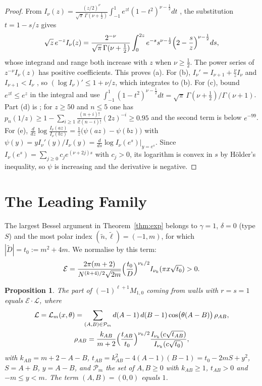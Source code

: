 \documentclass[11pt]{amsart}
\numberwithin{equation}{section}
\theoremstyle{plain}
\newtheorem{prop}[thm]{Proposition}
\theoremstyle{definition}
\theoremstyle{remark}
\newcommand{\cE}{\mathcal{E}}
\newcommand{\cL}{\mathcal{L}}
\begin{document}
\begin{proof}
From $I_\nu(z)=\frac{(z/2)^\nu}{\sqrt\pi\,\Gamma(\nu+\frac12)}\int_{-1}^1e^{zt}(1-t^2)^{\nu-\frac12}dt$ \cite[10.32.2]{DLMF}, the substitution $t=1-s/z$ gives
\[
\sqrt z\,e^{-z}I_\nu(z)=\frac{2^{-\nu}}{\sqrt\pi\,\Gamma(\nu+\frac12)}\int_0^{2z}e^{-s}s^{\nu-\frac12}\Bigl(2-\frac sz\Bigr)^{\nu-\frac12}ds,
\]
whose integrand and range both increase with $z$ when $\nu\ge\frac12$. The power series of $z^{-\nu}I_\nu(z)$ has positive coefficients. This proves (a). For (b), $I_\nu'=I_{\nu+1}+\frac\nu zI_\nu$ and $I_{\nu+1}<I_\nu$ \cite{Son65}, so $(\log I_\nu)'\le1+\nu/z$, which integrates to (b). For (c), bound $e^{zt}\le e^z$ in the integral and use $\int_{-1}^1(1-t^2)^{\nu-\frac12}dt=\sqrt\pi\,\Gamma(\nu+\frac12)/\Gamma(\nu+1)$. Part (d) is \cite[10.47.11, 10.49.12]{DLMF}; for $z\ge50$ and $n\le5$ one has $p_n(1/z)\ge1-\sum_{i\ge1}\frac{(n+i)!}{i!(n-i)!}(2z)^{-i}\ge0.95$ and the second term is below $e^{-99}$. For (e), $\frac{d}{dz}\log\frac{I_\nu(az)}{I_\nu(bz)}=\frac1z\bigl(\psi(az)-\psi(bz)\bigr)$ with $\psi(y)=yI_\nu'(y)/I_\nu(y)=\frac{d}{ds}\log I_\nu(e^s)\big|_{y=e^s}$. Since $I_\nu(e^s)=\sum_{j\ge0}c_je^{(\nu+2j)s}$ with $c_j>0$, its logarithm is convex in $s$ by H\"older's inequality, so $\psi$ is increasing and the derivative is negative.
\end{proof}

\section{The Leading Family}\label{sec:lead}

The largest Bessel argument in Theorem~\ref{thm:exp} belongs to $\gamma=1$, $\delta=0$ (type $S$) and the most polar index $(\tilde n,\tilde\ell)=(-1,m)$, for which $|\tilde D|=t_0:=m^2+4m$. We normalise by this term:
\begin{equation}\label{eq:Ecal}
\cE=\frac{2\pi(m+2)}{N^{(k+4)/2}\sqrt{2m}}\Bigl(\frac{t_0}{D}\Bigr)^{\nu_k/2}I_{\nu_k}(\pi x\sqrt{t_0})>0 .
\end{equation}

\begin{prop}\label{prop:lead}
The part of $(-1)^{\ell+1}M_{1,0}$ coming from walls with $r=s=1$ equals $\cE\cdot\cL$, where
\begin{equation}\label{eq:Lm}\begin{gathered}
\cL=\cL_m(x,\theta)=\sum_{(A,B)\in\mathcal P_m}d(A-1)\,d(B-1)\cos\bigl(\theta(A-B)\bigr)\,\rho_{AB},\\
\rho_{AB}=\frac{k_{AB}}{m+2}\Bigl(\frac{t_{AB}}{t_0}\Bigr)^{\nu_k/2}\frac{I_{\nu_k}(c\sqrt{t_{AB}})}{I_{\nu_k}(c\sqrt{t_0})},
\end{gathered}\end{equation}
with $k_{AB}=m+2-A-B$, $t_{AB}=k_{AB}^2-4(A-1)(B-1)=t_0-2mS+y^2$, $S=A+B$, $y=A-B$, and $\mathcal P_m$ the set of $A,B\ge0$ with $k_{AB}\ge1$, $t_{AB}>0$ and $-m\le y<m$. The term $(A,B)=(0,0)$ equals $1$.
\end{prop}
\end{document}
